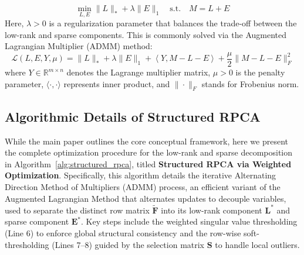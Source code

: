 \begin{equation}
    \min_{L, E} \|L\|_* + \lambda \|E\|_1 \quad \text{s.t.} \quad M = L + E \label{eq:RPCA-approx}
\end{equation}
Here, $\lambda > 0$ is a regularization parameter that balances the trade-off between the low-rank and sparse components.
This is commonly solved via the Augmented Lagrangian Multiplier (ADMM) method:
\begin{equation}
    \mathcal{L}(L, E, Y, \mu) = \|L\|_* + \lambda \|E\|_1 + \left\langle Y, M - L - E \right\rangle + \frac{\mu}{2} \|M - L - E\|_F^2 \label{eq:RPCA-lagrange}
\end{equation}
where $Y \in \mathbb{R}^{m \times n}$ denotes the Lagrange multiplier matrix, $\mu > 0$ is the penalty parameter, $\langle \cdot, \cdot \rangle$ represents inner product, and  $\|\cdot\|_F$ stands for Frobenius norm.

\subsection{Algorithmic Details of Structured RPCA}
\label{subsec:algorithm}
While the main paper outlines the core conceptual framework, here we present the complete optimization procedure for the low-rank and sparse decomposition in Algorithm~\ref{alg:structured_rpca}, titled \textbf{Structured RPCA via Weighted Optimization}. 
Specifically, this algorithm details the iterative Alternating Direction Method of Multipliers (ADMM) process, an efficient variant of the Augmented Lagrangian Method that alternates updates to decouple variables, used to separate the distinct row matrix $\tilde{\mathbf{F}}$ into its low-rank component $\mathbf{L}^*$ and sparse component $\mathbf{E}^*$. 
Key steps include the weighted singular value thresholding (Line 6) to enforce global structural consistency and the row-wise soft-thresholding (Lines 7--8) guided by the selection matrix $\mathbf{S}$ to handle local outliers.

